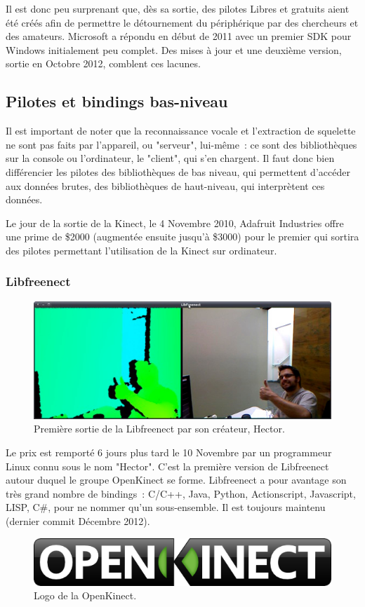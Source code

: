 Il est donc peu surprenant que, dès sa sortie, des pilotes Libres et gratuits
aient été créés afin de permettre le détournement du périphérique par des
chercheurs et des amateurs. Microsoft a répondu en début de 2011 avec un
premier SDK pour Windows initialement peu complet. Des mises à jour et une
deuxième version, sortie en Octobre 2012, comblent ces lacunes\cite{wiki_kinect}.

\subsection{Pilotes et bindings bas-niveau}

Il est important de noter que la reconnaissance vocale et l'extraction de 
squelette ne sont pas faits par l'appareil, ou "serveur", lui-même~: ce sont des
bibliothèques sur la console ou l'ordinateur, le "client", qui s'en chargent. 
Il faut donc bien
différencier les pilotes des bibliothèques de bas niveau, qui permettent 
d'accéder aux données brutes, des
bibliothèques de haut-niveau, qui interprètent ces données.

Le jour de la sortie de la Kinect, le 4 Novembre 2010, Adafruit Industries 
offre une prime de \$2000 (augmentée ensuite jusqu'à \$3000) pour le premier qui
sortira des pilotes permettant l'utilisation de la Kinect sur ordinateur\cite{adafruit_bounty}.

\subsubsection{Libfreenect}
\begin{figure}[h!]
\centering
\includegraphics[width=\linewidth]{../images/hector}
\caption{Première sortie de la Libfreenect par son créateur, Hector.}
\end{figure}
Le prix est remporté 6 jours plus tard le 10 Novembre par un programmeur Linux
connu sous le nom "Hector"\cite{adafruit_winner}. C'est la première version de Libfreenect autour
duquel le groupe OpenKinect se forme. Libfreenect a pour avantage son
très grand nombre de bindings~: C/C++, Java, Python, Actionscript, Javascript,
LISP, C\#, pour ne nommer qu'un sous-ensemble. 
Il est toujours maintenu (dernier commit Décembre 2012).
\begin{figure}[h!]
\centering
\includegraphics[width=0.5\linewidth]{../images/openkinect_logo}
\caption{Logo de la OpenKinect.}
\end{figure}

